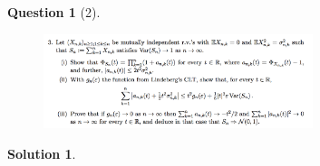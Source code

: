 \documentclass{article} %
\theoremstyle{quest}
\newtheorem*{question}{Question}
\newtheorem*{solution}{Solution}
\begin{document}
\newpage

\begin{question}[2]
\hfill
\begin{figure}[h!]
  \centering
    \includegraphics[width=0.7\textwidth]{prob-e8-p3.png}
\end{figure}
\end{question}
\begin{solution} \hfill \\
\end{solution}

\newpage
\end{document}
